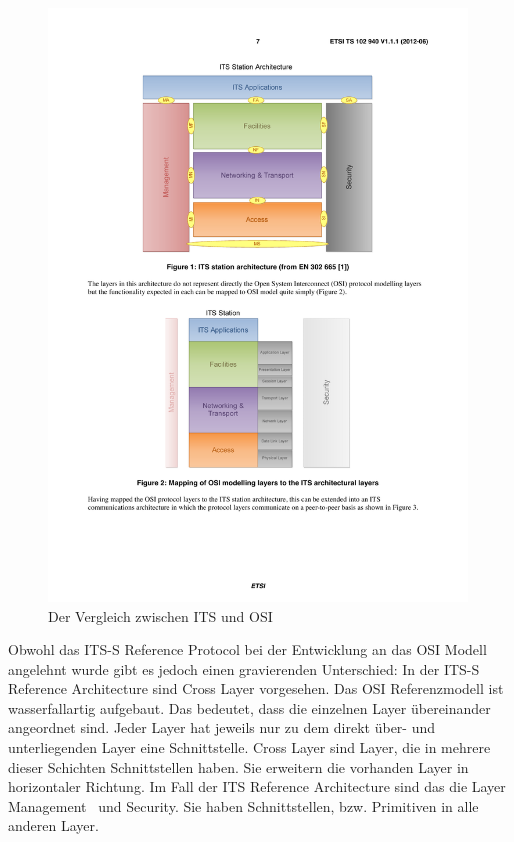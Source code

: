 \begin{figure}[h]
	\includegraphics[width=0.99\textwidth]{content/images/02_architektur/vergleichITS-OSI.pdf}
	\caption{Der Vergleich zwischen ITS und OSI \cite{ts102940}}
	\label{fig:architektur_vergleichItsOsi}
\end{figure}

Obwohl das \ac{ITS-S} Reference Protocol bei der Entwicklung an das \ac{OSI} Modell angelehnt wurde gibt es jedoch einen gravierenden Unterschied: In der \ac{ITS-S} Reference Architecture sind Cross Layer vorgesehen. Das \ac{OSI} Referenzmodell ist wasserfallartig aufgebaut. Das bedeutet, dass die einzelnen Layer übereinander angeordnet sind. Jeder Layer hat jeweils nur zu dem direkt über- und unterliegenden Layer eine Schnittstelle. Cross Layer sind Layer, die in mehrere dieser Schichten Schnittstellen haben. Sie erweitern die vorhanden Layer in horizontaler Richtung. Im Fall der \ac{ITS} Reference Architecture sind das die Layer \glqq Management\grqq~ und \glqq Security\grqq. Sie haben Schnittstellen, bzw. Primitiven in alle anderen Layer. 

